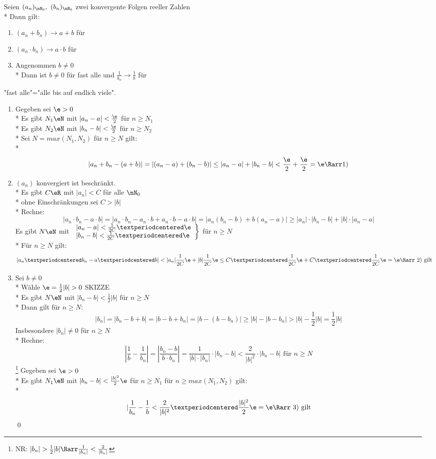 Seien $(a_n)_{\nN_0},\ (b_n)_{\nN_0}$ zwei konvergente Folgen reeller Zahlen\\*
Dann gilt:
\begin{enumerate}
\item{$(a_n+b_n)→a+b$ für \nif}
\item{$(a_n·b_n)→a·b$ für \nif}
\item{Angenommen $b\neq 0$\\*
Dann ist $b\neq 0$ für fast alle \nN{} und $\frac{1}{b_n}→\frac{1}{b}$ für \nif}
\end{enumerate}
%
"fast alle"="alle bis auf endlich viele".
%
\bew
\begin{enumerate}
\item{Gegeben sei $\e>0$\\*
Es gibt $N_1\eN$ mit $|a_n-a|<\frac{\e}{2}$ für $n\geq N_1$\\*
Es gibt $N_2\eN$ mit $|b_n-b|<\frac{\e}{2}$ für $n\geq N_2$\\*
Sei $N=max(N_1,N_2)$ für $n\geq N$ gilt:\\*
$$|a_n+b_n-(a+b)|=|(a_n-a)+(b_n-b)|\leq |a_n-a|+|b_n-b|<\frac{\e}{2}+\frac{\e}{2}=\e \Rarr \text{1)}$$}
\item{$(a_n)$ konvergiert \Rarr{} ist beschränkt.\\*
Es gibt $C\eR$ mit $|a_n|<C$ für alle $\nN_0$\\*
ohne Einschränkungen sei $C>|b|$\\*
Rechne:
$$|a_n·b_n-a·b|=|a_n·b_n-a_n·b+a_n·b-a·b|=|a_n(b_n-b)+b(a_n-a)|\geq |a_n|·|b_n-b|+|b|·|a_n-a|$$
Es gibt $N\eN$ mit $\left.\begin{array}{l}|a_n-a|<\frac{1}{2C}·\e\\*|b_n-b|<\frac{1}{2C}·\e\end{array} \right\}$ für $n\geq N$\\*
Für $n\geq N$ gilt:
$$|a_n·b_n-a·b|<|a_n|\frac{1}{2C}\e+|b|\frac{1}{2C}\e\leq C·\frac{1}{2C}\e+C·\frac{1}{2C}\e=\e \Rarr \text{ 2) gilt}$$}
\item{Sei $b\neq 0$\\*
Wähle $\e=\frac{1}{2}|b|>0$ SKIZZE\\*
Es gibt $N\eN$ mit $|b_n-b|<\frac{1}{2}|b|$ für $n\geq N$\\*
Dann gilt für $n\geq N$:
$$|b_n|=|b_n-b+b|=|b-b+b_n|=|b-(b-b_n)|\geq |b|-|b-b_n|>|b|-\frac{1}{2}|b|=\frac{1}{2}|b|$$
Insbesondere $|b_n|\neq 0$ für $n\geq N$\\*
Rechne:
$$\left|\frac{1}{b}-\frac{1}{b_n}\right|=\left|\frac{b_n-b}{b·b_n}\right|=\frac{1}{|b|·|b_n|}·|b_n-b|<\frac{2}{|b|^2}·|b_n-b| \text{ für $n\geq N$}$$\footnote{NR: $|b_n|>\frac{1}{2}|b| \Rarr \frac{1}{|b_n|}<\frac{2}{|b_n|}$}
Gegeben sei $\e>0$\\*
Es gibt $N_1\eN$ mit $|b_n-b|<\frac{|b|^2}{2}\e$ für $n\geq N_1$\Rarr{} für $n\geq max(N_1,N_2)$ gilt:\\*
$$|\frac{1}{b_n}-\frac{1}{b}<\frac{2}{|b|^2}·\frac{|b|^2}{2}\e=\e \Rarr \text{ 3) gilt}$$\qed}
\end{enumerate}
